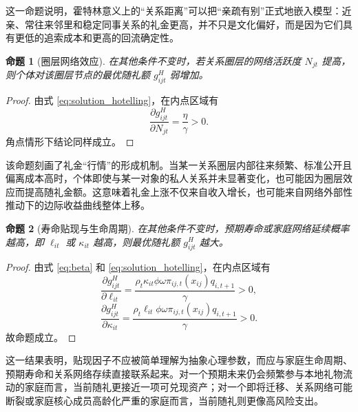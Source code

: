 \documentclass[12pt,a4paper]{ctexart}
\newtheorem{proposition}{命题}
\begin{document}
这一命题说明，霍特林意义上的“关系距离”可以把“亲疏有别”正式地嵌入模型：近亲、常往来邻里和稳定同事关系的礼金更高，并不只是文化偏好，而是因为它们具有更低的追索成本和更高的回流确定性。

\begin{proposition}[圈层网络效应]
在其他条件不变时，若关系圈层的网络活跃度 $N_{jt}$ 提高，则个体对该圈层节点的最优随礼额 $g_{ijt}^{H}$ 弱增加。
\end{proposition}

\begin{proof}
由式 \eqref{eq:solution_hotelling}，在内点区域有
\[
\frac{\partial g_{ijt}^{H}}{\partial N_{jt}}
=
\frac{\eta}{\gamma}
>0.
\]
角点情形下结论同样成立。
\end{proof}

该命题刻画了礼金“行情”的形成机制。当某一关系圈层内部往来频繁、标准公开且偏离成本高时，个体即使与某一对象的私人关系并未显著变化，也可能因为圈层效应而提高随礼金额。这意味着礼金上涨不仅来自收入增长，也可能来自网络外部性推动下的边际收益曲线整体上移。

\begin{proposition}[寿命贴现与生命周期]
在其他条件不变时，预期寿命或家庭网络延续概率越高，即 $\ell_{it}$ 或 $\kappa_{it}$ 越高，则最优随礼额 $g_{ijt}^{H}$ 越大。
\end{proposition}

\begin{proof}
由式 \eqref{eq:beta} 和 \eqref{eq:solution_hotelling}，在内点区域有
\[
\frac{\partial g_{ijt}^{H}}{\partial \ell_{it}}
=
\frac{\rho_t\kappa_{it}\phi\omega \pi_{ij,t}(x_{ij}) q_{i,t+1}}{\gamma}
>0,
\]
\[
\frac{\partial g_{ijt}^{H}}{\partial \kappa_{it}}
=
\frac{\rho_t\ell_{it}\phi\omega \pi_{ij,t}(x_{ij}) q_{i,t+1}}{\gamma}
>0.
\]
故命题成立。
\end{proof}

这一结果表明，贴现因子不应被简单理解为抽象心理参数，而应与家庭生命周期、预期寿命和关系网络存续直接联系起来。对一个预期未来仍会频繁参与本地礼物流动的家庭而言，当前随礼更接近一项可兑现资产；对一个即将迁移、关系网络可能断裂或家庭核心成员高龄化严重的家庭而言，当前随礼则更像高风险支出。
\end{document}
